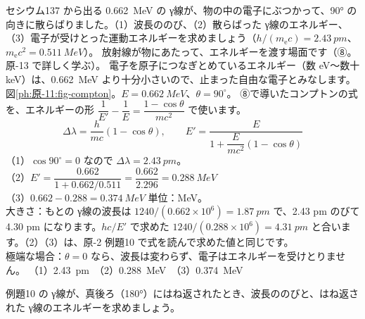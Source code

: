 \label{ph:原-11:ex10}
\begin{phreidai}[コンプトン散乱でエネルギーを失う γ線]
セシウム137 から出る \qty{0.662}{MeV} の γ線が、物の中の電子にぶつかって、90° の向きに散らばりました。（1）波長ののび、（2）散らばった γ線のエネルギー、（3）電子が受けとった運動エネルギーを求めましょう（$h/(m_{\mathrm e}c)=\qty{2.43}{pm}$、$m_{\mathrm e}c^2=\qty{0.511}{MeV}$）。
\phbamen
放射線が物にあたって、エネルギーを渡す場面です（⑧。原-13 で詳しく学ぶ）。
\phmushi
電子を原子につなぎとめているエネルギー（数 eV〜数十 keV）は、\qty{0.662}{MeV} より十分小さいので、止まった自由な電子とみなします。
\phzu
図\ref{ph:原-11:fig-compton}。$E=\qty{0.662}{MeV}$、$\theta=90^\circ$。
\phriyu
⑧で導いたコンプトンの式を、エネルギーの形 $\dfrac1{E'}-\dfrac1E=\dfrac{1-\cos\theta}{mc^2}$ で使います。
\phtateru
\[ \Delta\lambda=\frac{h}{mc}(1-\cos\theta),\qquad E'=\frac{E}{1+\dfrac{E}{mc^2}(1-\cos\theta)} \]
\phtoku
（1）$\cos90^\circ=0$ なので $\Delta\lambda=\qty{2.43}{pm}$。\\
（2）$E'=\dfrac{0.662}{1+0.662/0.511}=\dfrac{0.662}{2.296}=\qty{0.288}{MeV}$\\
（3）$0.662-0.288=\qty{0.374}{MeV}$
\phtashikame
単位：MeV。\\
大きさ：もとの γ線の波長は $1240/(0.662\times10^6)=\qty{1.87}{pm}$ で、2.43 pm のびて 4.30 pm になります。$hc/E'$ で求めた $1240/(0.288\times10^6)=\qty{4.31}{pm}$ と合います。（2）（3）は、原-2 例題10 で式を読んで求めた値と同じです。\\
極端な場合：$\theta=0$ なら、波長は変わらず、電子はエネルギーを受けとりません。
\kotae （1）\qty{2.43}{pm}　（2）\qty{0.288}{MeV}　（3）\qty{0.374}{MeV}
\end{phreidai}
\begin{jibun}
例題10 の γ線が、真後ろ（180°）にはね返されたとき、波長ののびと、はね返された γ線のエネルギーを求めましょう。
\end{jibun}

